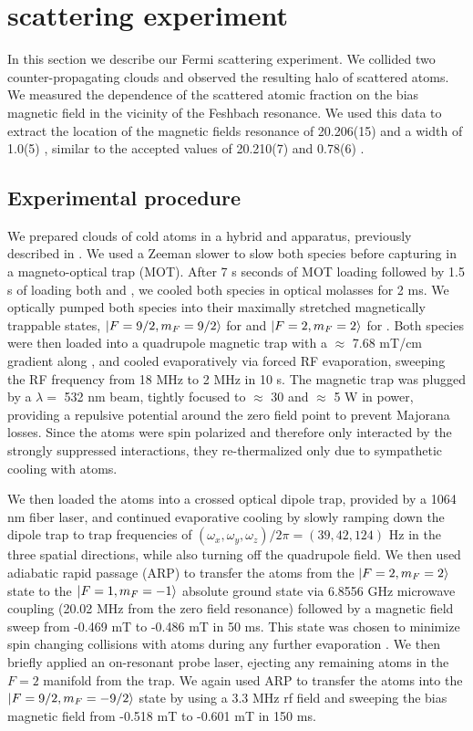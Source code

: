 \documentclass[12pt]{iopart}
\begin{document}
\section{\swave{} scattering experiment}
In this section we describe our Fermi scattering experiment. We collided two counter-propagating \K{} clouds and observed the resulting \swave{} halo of scattered atoms.  We measured the dependence of the scattered atomic fraction on the bias magnetic field in the vicinity of the Feshbach resonance. We used this data to extract the location of the magnetic fields resonance of 20.206(15) \mT{} and a width of 1.0(5) \mT{}, similar to the accepted values of 20.210(7) \mT{} and 0.78(6) \mT{} \cite{Regal04}.
\subsection{Experimental procedure}
We prepared clouds of cold \K{} atoms in a hybrid \K{} and \Rb{} apparatus, previously described in \cite{Williams13, Lin09, KarinaThesis}. We used a Zeeman slower to slow both species before capturing in a magneto-optical trap (MOT). After 7 s seconds of MOT loading \K{} followed by 1.5 s of loading both \K{} and \Rb{}, we cooled both species in optical molasses for 2 ms. We optically pumped both species into their maximally stretched magnetically trappable states, $\mathinner{|{F=9/2, m_F=9/2}\rangle}$ for \K{} and $\mathinner{|{F=2,m_F=2}\rangle}$ for \Rb{}. Both species were then loaded into a quadrupole magnetic trap with a $\approx$ 7.68 mT/cm gradient along \ez{}, and cooled evaporatively via forced RF evaporation, sweeping the RF frequency from 18 MHz to 2 MHz in 10 s. The magnetic trap was plugged by a $\lambda =$ 532 nm beam, tightly focused to $\approx$ 30 \um{} and $\approx$ 5 W in power, providing a repulsive potential around the zero field point to prevent Majorana losses. Since the \K{} atoms were spin polarized and therefore only interacted by the strongly suppressed \pwave{} interactions, they re-thermalized only due to sympathetic cooling with \Rb{} atoms.

We then loaded the atoms into a crossed optical dipole trap, provided by a 1064 nm fiber laser, and continued evaporative cooling by slowly ramping down the dipole trap to trap frequencies of $(\omega_x,\omega_y,\omega_z)/2\pi =(39, 42, 124)$ Hz in the three spatial directions, while also turning off the quadrupole field. We then used adiabatic rapid passage (ARP) to transfer the \Rb{} atoms from the $\mathinner{|{F=2, m_F=2}\rangle}$ state to the  $\mathinner{|{F=1, m_F=-1}\rangle}$ absolute ground state via 6.8556 GHz microwave coupling (20.02 MHz from the zero field resonance) followed by a magnetic field sweep from -0.469 mT to -0.486 mT in 50 ms. This state was chosen to minimize spin changing collisions with \K{} atoms during any further evaporation \cite{BestThesis}.  We then briefly applied an on-resonant probe laser, ejecting any remaining \Rb{} atoms in the $F=2$ manifold from the trap. We again used ARP to transfer the \K{} atoms into the $\mathinner{|{F=9/2,m_F=-9/2}\rangle}$ state by using a 3.3 MHz rf field and sweeping the bias magnetic field from -0.518 mT to -0.601 mT in 150 ms.
\end{document}
